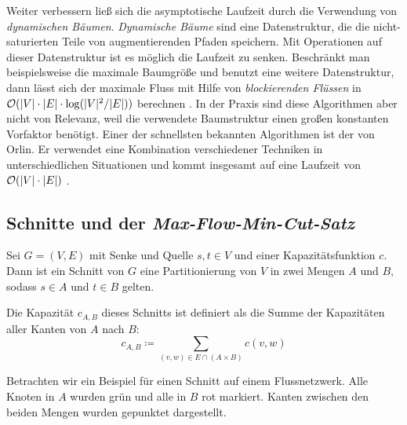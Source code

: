 Weiter verbessern ließ sich die asymptotische Laufzeit durch die Verwendung von \emph{dynamischen Bäumen}. \emph{Dynamische Bäume} sind eine Datenstruktur, die die nicht-saturierten Teile von augmentierenden Pfaden speichern. Mit Operationen auf dieser Datenstruktur ist es möglich die Laufzeit zu senken. Beschränkt man beispielsweise die maximale Baumgröße und benutzt eine weitere Datenstruktur, dann lässt sich der maximale Fluss mit Hilfe von \emph{blockierenden Flüssen} in $\mathcal{O}(|V|\cdot |E|\cdot \log(|V|^2/|E|))$ berechnen \citep{gt14}. In der Praxis sind diese Algorithmen aber nicht von Relevanz, weil die verwendete Baumstruktur einen großen konstanten Vorfaktor benötigt. Einer der schnellsten bekannten Algorithmen ist der von Orlin. Er verwendet eine Kombination verschiedener Techniken in unterschiedlichen Situationen und kommt insgesamt auf eine Laufzeit von $\mathcal{O}(|V|\cdot |E|)$ \citep{gt14}.
 
\subsection{Schnitte und der \emph{Max-Flow-Min-Cut-Satz}}

\begin{definition}[Schnitt]
	Sei $G = (V,E)$ mit Senke und Quelle $s, t \in V$ und einer Kapazitätsfunktion $c$. Dann ist ein Schnitt von $G$ eine Partitionierung von $V$ in zwei Mengen $A$ und $B$, sodass $s \in A$ und $t \in B$ gelten.
	
	Die Kapazität $c_{A,B}$ dieses Schnitts ist definiert als die Summe der Kapazitäten aller Kanten von $A$ nach $B$:
	\begin{equation}
		c_{A,B} \coloneqq \sum_{(v,w) \in E \cap (A \times B)}{c(v,w)}
	\end{equation}
\end{definition}

Betrachten wir ein Beispiel für einen Schnitt auf einem Flussnetzwerk. Alle Knoten in $A$ wurden grün und alle in $B$ rot markiert. Kanten zwischen den beiden Mengen wurden gepunktet dargestellt.

